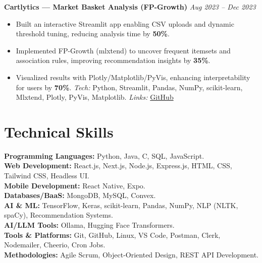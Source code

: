 \documentclass[10pt,a4paper]{article}
\begin{document}
	\textbf{Cartlytics — Market Basket Analysis (FP-Growth)} \hfill \textit{Aug 2023 -- Dec 2023}
	\begin{itemize}
		\item Built an interactive Streamlit app enabling CSV uploads and dynamic threshold tuning, reducing analysis time by \textbf{50\%}.  
		\item Implemented FP-Growth (mlxtend) to uncover frequent itemsets and association rules, improving recommendation insights by \textbf{35\%}.  
		\item Visualized results with Plotly/Matplotlib/PyVis, enhancing interpretability for users by \textbf{70\%}.  
		\emph{Tech:} Python, Streamlit, Pandas, NumPy, scikit-learn, Mlxtend, Plotly, PyVis, Matplotlib.  
		\emph{Links:} \href{https://github.com/ValupadasuSaiabbhiram/Cartlytics}{GitHub}
	\end{itemize}
	
	\section*{Technical Skills}
	
	\textbf{Programming Languages:} Python, Java, C, SQL, JavaScript.\\[0.25em]
	\textbf{Web Development:} React.js, Next.js, Node.js, Express.js, HTML, CSS, Tailwind CSS, Headless UI.\\[0.25em]
	\textbf{Mobile Development:} React Native, Expo.\\[0.25em]
	\textbf{Databases/BaaS:} MongoDB, MySQL, Convex.\\[0.25em]
	\textbf{AI \& ML:} TensorFlow, Keras, scikit-learn, Pandas, NumPy, NLP (NLTK, spaCy), Recommendation Systems.\\[0.25em]
	\textbf{AI/LLM Tools:} Ollama, Hugging Face Transformers.\\[0.25em]
	\textbf{Tools \& Platforms:} Git, GitHub, Linux, VS Code, Postman, Clerk, Nodemailer, Cheerio, Cron Jobs.\\[0.25em]
	\textbf{Methodologies:} Agile Scrum, Object-Oriented Design, REST API Development.
	
\end{document}
